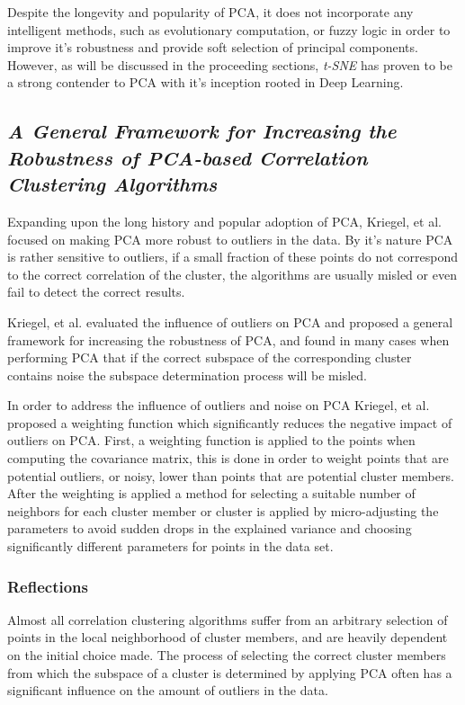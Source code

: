 \documentclass{article}
\begin{document}
Despite the longevity and popularity of PCA, it does not incorporate any intelligent methods, such as evolutionary computation, or fuzzy logic in order to improve it's robustness and provide soft selection of principal components. However, as will be discussed in the proceeding sections, \emph{t-SNE} has proven to be a strong contender to PCA with it's inception rooted in Deep Learning.




\subsection{\emph{A General Framework for Increasing the Robustness of PCA-based Correlation Clustering Algorithms}}

Expanding upon the long history and popular adoption of PCA, Kriegel, et al. focused on making PCA more robust to outliers in the data. By it's nature PCA is rather sensitive to outliers, if a small fraction of these points do not correspond to the correct correlation of the cluster, the algorithms are usually misled or even fail to detect the correct results\cite{kriegel2008general}.

Kriegel, et al. evaluated the influence of outliers on PCA and proposed a general framework for increasing the robustness of PCA, and found in many cases when performing PCA that if the correct subspace of the corresponding cluster contains noise the subspace determination process will be misled\cite{kriegel2008general}.

In order to address the influence of outliers and noise on PCA Kriegel, et al. proposed a weighting function which significantly reduces the negative impact of outliers on PCA.  First, a weighting function is applied to the points when computing the covariance matrix, this is done in order to weight points that are potential outliers, or noisy, lower than points that are potential cluster members. After the weighting is applied a method for selecting a suitable number of neighbors for each cluster member or cluster is applied by micro-adjusting the parameters to avoid sudden drops in the explained variance and choosing significantly different parameters for points in the data set\cite{kriegel2008general}.


\subsubsection{Reflections}

Almost all correlation clustering algorithms suffer from an arbitrary selection of points in the local neighborhood of cluster members, and are heavily dependent on the initial choice made. The process of selecting the correct cluster members from which the subspace of a cluster is determined by applying PCA often has a significant influence on the amount of outliers in the data.
\end{document}
